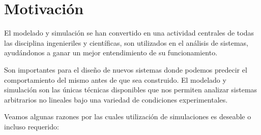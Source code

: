 \section{Motivación}
El modelado y simulación\cite{Zeigler} se han convertido en una actividad centrales de todas las disciplina ingenieriles y científicas, son utilizados en el análisis de sistemas, ayudándonos a ganar un mejor entendimiento de su funcionamiento. 

Son importantes para el diseño de nuevos sistemas donde podemos predecir el comportamiento del mismo antes de que sea construido.
El modelado y simulación son las únicas técnicas disponibles que nos permiten analizar sistemas arbitrarios no lineales bajo una variedad de condiciones experimentales.

Veamos algunas razones por las cuales utilización de simulaciones es deseable o incluso requerido:

